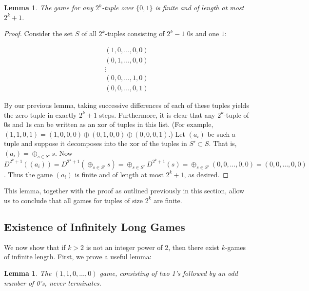 \documentclass[12pt]{amsart}
\newtheorem{lemma}[theorem]{Lemma}
\newcommand{\xor}{\oplus}
\begin{document}
\begin{lemma}
The game for any $2^k$-tuple over $\{0,1\}$ is finite and of length at most $2^k+1$.
\end{lemma}

\begin{proof}
Consider the set $S$ of all $2^k$-tuples consisting of $2^k-1$ $0$s and one $1$:

$$\begin{array}{c}
(1,0,\ldots,0,0) \\
(0,1,\ldots,0,0) \\
\vdots \\
(0,0,\ldots,1,0) \\
(0,0,\ldots,0,1)
\end{array}$$

By our previous lemma, taking successive differences of each of these tuples yields the zero tuple in exactly $2^k+1$ steps. Furthermore, it is clear that any $2^k$-tuple of $0$s and $1$s can be written as an xor of tuples in this list. (For example, $(1,1,0,1)=(1,0,0,0)\xor(0,1,0,0)\xor(0,0,0,1)$.) Let $(a_i)$ be such a tuple and suppose it decomposes into the xor of the tuples in $S'\subset S$. That is, $(a_i)=\xor_{s\in S'} s$. Now $D^{2^k+1}((a_i))=D^{2^k+1}(\xor_{s\in S'} s)=\xor_{s\in S'} D^{2^k+1}(s)=\xor_{s\in S'} (0,0,\ldots,0,0) = (0,0,\ldots,0,0)$. Thus the game $(a_i)$ is finite and of length at most $2^k+1$, as desired.
\end{proof}

This lemma, together with the proof as outlined previously in this section, allow us to conclude that all games for tuples of size $2^k$ are finite.

\subsection{Existence of Infinitely Long Games}

We now show that if $k > 2$ is not an integer power of 2, then there exist $k$-games of infinite length. First, we prove a useful lemma:

\begin{lemma}
The $(1, 1, 0, \ldots, 0)$ game, consisting of two 1's followed by an odd number of 0's, never terminates.
\label{lem:evenodds}
\end{lemma}
\end{document}
